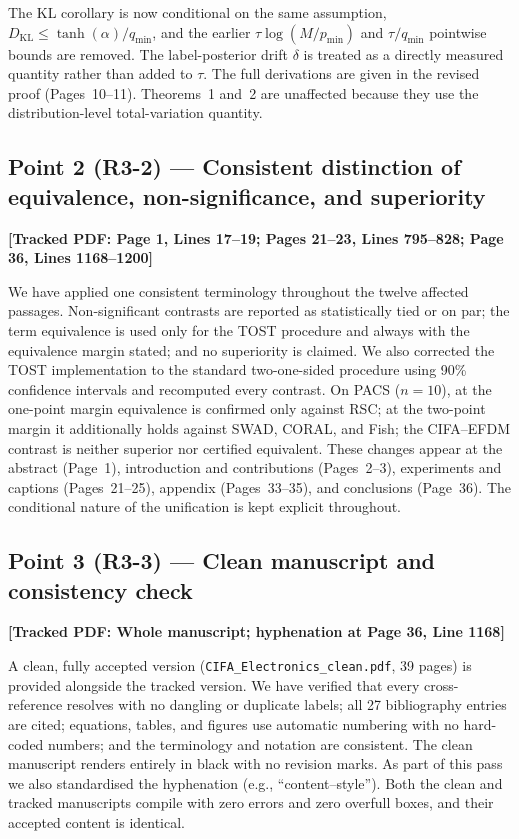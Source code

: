\documentclass[11pt]{article}
\newcommand{\loc}[1]{\textbf{[\textcolor{revblue}{Tracked PDF: #1}]}}
\begin{document}
The KL corollary is now conditional on the same assumption,
$D_{\mathrm{KL}}\le\tanh(\alpha)/q_{\min}$, and the earlier
$\tau\log(M/p_{\min})$ and $\tau/q_{\min}$ pointwise bounds are removed. The
label-posterior drift $\delta$ is treated as a directly measured quantity
rather than added to $\tau$. The full derivations are given in the revised
proof (Pages~10--11). Theorems~1 and~2 are unaffected because they use the
distribution-level total-variation quantity.

\subsection*{Point 2 (R3-2) --- Consistent distinction of equivalence, non-significance, and superiority}
\loc{Page 1, Lines 17--19; Pages 21--23, Lines 795--828; Page 36,
Lines 1168--1200}

\begin{sloppypar}
We have applied one consistent terminology throughout the twelve affected
passages. Non-significant contrasts are reported as statistically tied or on
par; the term equivalence is used only for the TOST procedure and always with
the equivalence margin stated; and no superiority is claimed. We also corrected
the TOST implementation to the standard two-one-sided procedure using 90\%
confidence intervals and recomputed every contrast. On PACS ($n=10$), at the
one-point margin equivalence is confirmed only against RSC; at the two-point
margin it additionally holds against SWAD, CORAL, and Fish; the CIFA--EFDM
contrast is neither superior nor certified equivalent. These changes appear at
the abstract (Page~1), introduction and contributions (Pages~2--3),
experiments and captions (Pages~21--25), appendix (Pages~33--35), and
conclusions (Page~36). The conditional nature of the unification is kept
explicit throughout.
\end{sloppypar}

\subsection*{Point 3 (R3-3) --- Clean manuscript and consistency check}
\loc{Whole manuscript; hyphenation at Page 36, Line 1168}

A clean, fully accepted version (\texttt{CIFA\_Electronics\_clean.pdf},
39 pages) is provided alongside the tracked version. We have verified that
every cross-reference resolves with no dangling or duplicate labels; all 27
bibliography entries are cited; equations, tables, and figures use automatic
numbering with no hard-coded numbers; and the terminology and notation are
consistent. The clean manuscript renders entirely in black with no revision
marks. As part of this pass we also standardised the hyphenation (e.g.,
``content--style''). Both the clean and tracked manuscripts compile with zero
errors and zero overfull boxes, and their accepted content is identical.
\end{document}
